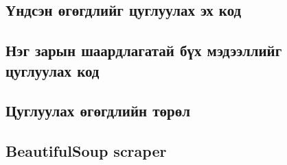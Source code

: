 \subsection{Үндсэн өгөгдлийг цуглуулах эх код}

\subsection{Нэг зарын шаардлагатай бүх мэдээллийг цуглуулах код}

\subsection{Цуглуулах өгөгдлийн төрөл}

\subsection{BeautifulSoup scraper}
